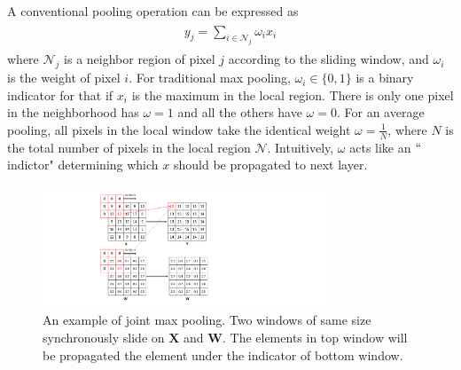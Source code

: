A conventional pooling operation can be expressed as
\begin{eqnarray}\label{pooling}
\begin{aligned}
y_{j} = \sum_{i\in \mathcal{N}_{j}} \omega_{i}x_{i}
\end{aligned}
\end{eqnarray}
where $\mathcal{N}_{j}$ is a neighbor region of pixel $j$ according to the sliding window, and $\omega_{i}$ is the weight of pixel $i$.
For traditional max pooling, $\omega_i \in \{0,1\}$ is a binary indicator for that if $x_i$ is the maximum in the local region.
There is only one pixel in the neighborhood has $\omega=1$ and all the others have $\omega=0$.
For an average pooling, all pixels in the local window take the identical weight $\omega=\frac{1}{N}$, where $N$ is the total number of pixels in the local region $\mathcal{N}$.
Intuitively, $\omega$ acts like an $``$indictor" determining which $x$ should be propagated to next layer.

\begin{figure}
    \begin{center}
        \includegraphics[width=3.4in]{figures/FigSMP.pdf}
    \end{center}
    \caption{An example of joint max pooling.
        Two windows of same size synchronously slide on $\mathbf{X}$ and $\mathbf{W}$.
       The elements in top window will be propagated the element under the indicator of bottom window.}
    \label{FigSMP}
\end{figure}


